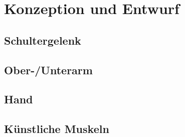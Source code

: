 \chapter{Konzeption und Entwurf}


\section{Schultergelenk}


\section{Ober-/Unterarm}


\section{Hand}


\section{Künstliche Muskeln}